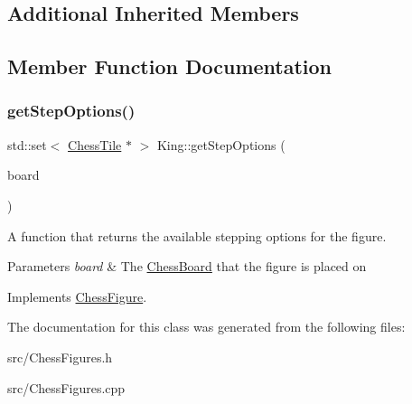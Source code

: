 \subsection*{Additional Inherited Members}


\subsection{Member Function Documentation}
\mbox{\label{classKing_a69703f80ac8c30335e4d745ee11518d7}} 
\subsubsection{\texorpdfstring{get\+Step\+Options()}{getStepOptions()}}
{\footnotesize\ttfamily std\+::set$<$ \mbox{\hyperlink{classChessTile}{Chess\+Tile}} $\ast$ $>$ King\+::get\+Step\+Options (\begin{DoxyParamCaption}\item[{\mbox{\hyperlink{classChessBoard}{Chess\+Board}} \&}]{board }\end{DoxyParamCaption})\hspace{0.3cm}{\ttfamily [virtual]}}



A function that returns the available stepping options for the figure. 


\begin{DoxyParams}{Parameters}
{\em board} & The \mbox{\hyperlink{classChessBoard}{Chess\+Board}} that the figure is placed on \\
\hline
\end{DoxyParams}


Implements \mbox{\hyperlink{classChessFigure_ae78d52e35c4ea926f492d211c69758bd}{Chess\+Figure}}.



The documentation for this class was generated from the following files\+:\begin{DoxyCompactItemize}
\item 
src/Chess\+Figures.\+h\item 
src/Chess\+Figures.\+cpp\end{DoxyCompactItemize}
